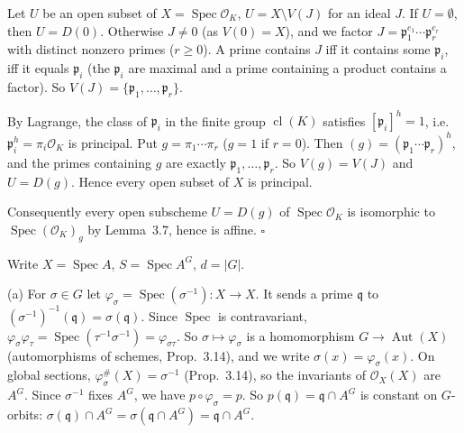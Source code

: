 \documentclass[11pt]{article}
\begin{document}
Let $U$ be an open subset of $X=\operatorname{Spec}\mathcal{O}_K$, $U=X\setminus V(J)$ for an ideal $J$. If $U=\emptyset$, then $U=D(0)$. Otherwise $J\neq0$ (as $V(0)=X$), and we factor $J=\mathfrak p_1^{e_1}\cdots\mathfrak p_r^{e_r}$ with distinct nonzero primes ($r\ge0$). A prime contains $J$ iff it contains some $\mathfrak p_i$, iff it equals $\mathfrak p_i$ (the $\mathfrak p_i$ are maximal and a prime containing a product contains a factor). So $V(J)=\{\mathfrak p_1,\dots,\mathfrak p_r\}$.

By Lagrange, the class of $\mathfrak p_i$ in the finite group $\operatorname{cl}(K)$ satisfies $[\mathfrak p_i]^h=1$, i.e.\ $\mathfrak p_i^h=\pi_i\mathcal{O}_K$ is principal. Put $g=\pi_1\cdots\pi_r$ ($g=1$ if $r=0$). Then $(g)=(\mathfrak p_1\cdots\mathfrak p_r)^h$, and the primes containing $g$ are exactly $\mathfrak p_1,\dots,\mathfrak p_r$. So $V(g)=V(J)$ and $U=D(g)$. Hence every open subset of $X$ is principal.

Consequently every open subscheme $U=D(g)$ of $\operatorname{Spec}\mathcal{O}_K$ is isomorphic to $\operatorname{Spec}(\mathcal{O}_K)_g$ by Lemma~3.7, hence is affine. \hfill$\square$

\pf
Write $X=\operatorname{Spec}A$, $S=\operatorname{Spec}A^G$, $d=|G|$.

(a) For $\sigma\in G$ let $\varphi_\sigma=\operatorname{Spec}(\sigma^{-1}):X\to X$. It sends a prime $\mathfrak q$ to $(\sigma^{-1})^{-1}(\mathfrak q)=\sigma(\mathfrak q)$. Since $\operatorname{Spec}$ is contravariant, $\varphi_\sigma\varphi_\tau=\operatorname{Spec}(\tau^{-1}\sigma^{-1})=\varphi_{\sigma\tau}$. So $\sigma\mapsto\varphi_\sigma$ is a homomorphism $G\to\operatorname{Aut}(X)$ (automorphisms of schemes, Prop.~3.14), and we write $\sigma(x)=\varphi_\sigma(x)$. On global sections, $\varphi_\sigma^\#(X)=\sigma^{-1}$ (Prop.~3.14), so the invariants of $\mathcal{O}_X(X)$ are $A^G$. Since $\sigma^{-1}$ fixes $A^G$, we have $p\circ\varphi_\sigma=p$. So $p(\mathfrak q)=\mathfrak q\cap A^G$ is constant on $G$-orbits: $\sigma(\mathfrak q)\cap A^G=\sigma(\mathfrak q\cap A^G)=\mathfrak q\cap A^G$.
\end{document}
